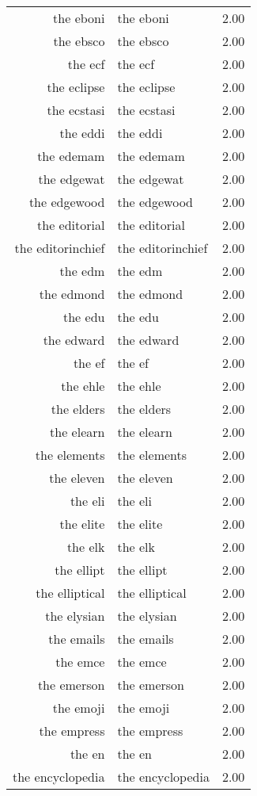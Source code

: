 \begin{table}[ht]
\begin{tabular}{rlr}
  the eboni & the eboni & 2.00 \\ 
  the ebsco & the ebsco & 2.00 \\ 
  the ecf & the ecf & 2.00 \\ 
  the eclipse & the eclipse & 2.00 \\ 
  the ecstasi & the ecstasi & 2.00 \\ 
  the eddi & the eddi & 2.00 \\ 
  the edemam & the edemam & 2.00 \\ 
  the edgewat & the edgewat & 2.00 \\ 
  the edgewood & the edgewood & 2.00 \\ 
  the editorial & the editorial & 2.00 \\ 
  the editorinchief & the editorinchief & 2.00 \\ 
  the edm & the edm & 2.00 \\ 
  the edmond & the edmond & 2.00 \\ 
  the edu & the edu & 2.00 \\ 
  the edward & the edward & 2.00 \\ 
  the ef & the ef & 2.00 \\ 
  the ehle & the ehle & 2.00 \\ 
  the elders & the elders & 2.00 \\ 
  the elearn & the elearn & 2.00 \\ 
  the elements & the elements & 2.00 \\ 
  the eleven & the eleven & 2.00 \\ 
  the eli & the eli & 2.00 \\ 
  the elite & the elite & 2.00 \\ 
  the elk & the elk & 2.00 \\ 
  the ellipt & the ellipt & 2.00 \\ 
  the elliptical & the elliptical & 2.00 \\ 
  the elysian & the elysian & 2.00 \\ 
  the emails & the emails & 2.00 \\ 
  the emce & the emce & 2.00 \\ 
  the emerson & the emerson & 2.00 \\ 
  the emoji & the emoji & 2.00 \\ 
  the empress & the empress & 2.00 \\ 
  the en & the en & 2.00 \\ 
  the encyclopedia & the encyclopedia & 2.00 \\ 

\end{tabular}
\end{table}
